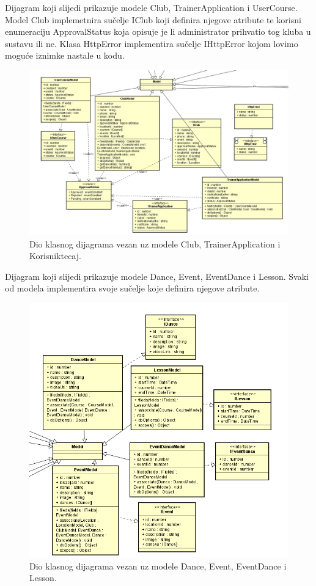 			\noindent Dijagram koji slijedi prikazuje modele Club, TrainerApplication i UserCourse.
			Model Club implemetnira sučelje IClub koji definira njegove atribute te korisni enumeraciju ApprovalStatus koja opisuje je li 
			administrator prihvatio tog kluba u sustavu ili ne. Klasa HttpError implementira sučelje IHttpError kojom lovimo moguće iznimke 
			nastale u kodu.\\
			\begin{figure}[H]
				\includegraphics[scale=0.7]{slike/class2.png}
				\centering
				\caption{Dio klasnog dijagrama vezan uz modele Club, TrainerApplication i Korisniktecaj.}
				\label{fig:class1}
			\end{figure}

			\noindent Dijagram koji slijedi prikazuje modele Dance, Event, EventDance i Lesson. Svaki od modela implementira  svoje sučelje koje definira njegove atribute. \\
			\begin{figure}[H]
				\includegraphics[scale=1.0]{slike/class3.png}
				\centering
				\caption{Dio klasnog dijagrama vezan uz modele Dance, Event, EventDance i Lesson.}
				\label{fig:class1}
			\end{figure}

